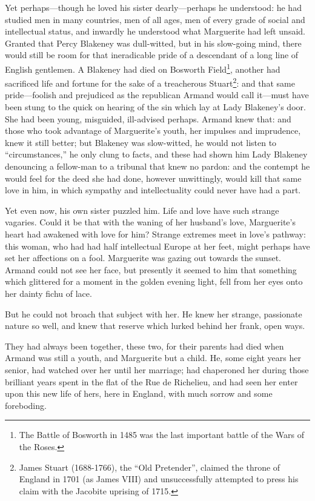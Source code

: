 Yet perhaps---though he loved his sister dearly---perhaps he understood: he had studied men in many countries, men of all ages, men of every grade of social and intellectual status, and inwardly he understood what Marguerite had left unsaid. Granted that Percy Blakeney was dull-witted, but in his slow-going mind, there would still be room for that ineradicable pride of a descendant of a long line of English gentlemen. A Blakeney had died on Bosworth Field\footnote{The Battle of Bosworth in 1485 was the last important battle of the Wars of the Roses.}, another had sacrificed life and fortune for the sake of a treacherous Stuart\footnote{James Stuart (1688-1766), the \enquote{Old Pretender}, claimed the throne of England in 1701 (as James VIII) and unsuccessfully attempted to press his claim with the Jacobite uprising of 1715.}: and that same pride---foolish and prejudiced as the republican Armand would call it---must have been stung to the quick on hearing of the sin which lay at Lady Blakeney's door. She had been young, misguided, ill-advised perhaps. Armand knew that: and those who took advantage of Marguerite's youth, her impulses and imprudence, knew it still better; but Blakeney was slow-witted, he would not listen to \enquote{circumstances,} he only clung to facts, and these had shown him Lady Blakeney denouncing a fellow-man to a tribunal that knew no pardon: and the contempt he would feel for the deed she had done, however unwittingly, would kill that same love in him, in which sympathy and intellectuality could never have had a part.

Yet even now, his own sister puzzled him. Life and love have such strange vagaries. Could it be that with the waning of her husband's love, Marguerite's heart had awakened with love for him? Strange extremes meet in love's pathway: this woman, who had had half intellectual Europe at her feet, might perhaps have set her affections on a fool. Marguerite was gazing out towards the sunset. Armand could not see her face, but presently it seemed to him that something which glittered for a moment in the golden evening light, fell from her eyes onto her dainty fichu of lace.

But he could not broach that subject with her. He knew her strange, passionate nature so well, and knew that reserve which lurked behind her frank, open ways.

They had always been together, these two, for their parents had died when Armand was still a youth, and Marguerite but a child. He, some eight years her senior, had watched over her until her marriage; had chaperoned her during those brilliant years spent in the flat of the Rue de Richelieu, and had seen her enter upon this new life of hers, here in England, with much sorrow and some foreboding.

